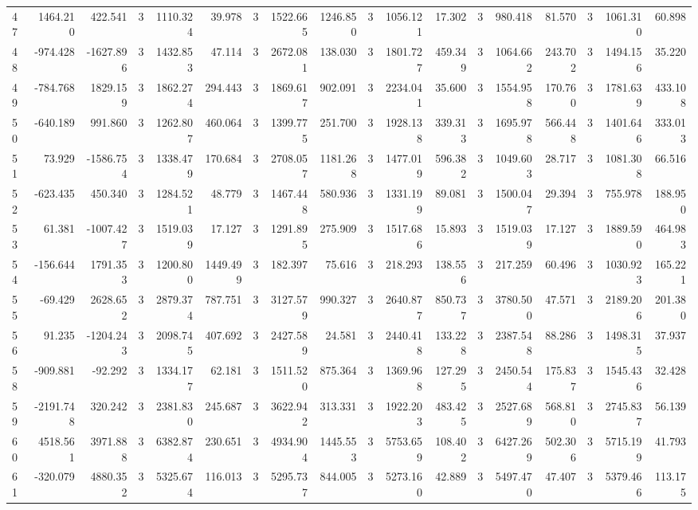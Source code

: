 \begin{table}[ht]
\begin{tabular}{lrrrrrrrrrrrrrrrrr}
47 & 1464.210 & 422.541 & 3 & 1110.324 & 39.978 & 3 & 1522.665 & 1246.850 & 3 & 1056.121 & 17.302 & 3 & 980.418 & 81.570 & 3 & 1061.310 & 60.898 \\
48 & -974.428 & -1627.896 & 3 & 1432.853 & 47.114 & 3 & 2672.081 & 138.030 & 3 & 1801.727 & 459.349 & 3 & 1064.662 & 243.702 & 3 & 1494.156 & 35.220 \\
49 & -784.768 & 1829.159 & 3 & 1862.274 & 294.443 & 3 & 1869.617 & 902.091 & 3 & 2234.041 & 35.600 & 3 & 1554.958 & 170.760 & 3 & 1781.639 & 433.108 \\
50 & -640.189 & 991.860 & 3 & 1262.807 & 460.064 & 3 & 1399.775 & 251.700 & 3 & 1928.138 & 339.313 & 3 & 1695.978 & 566.448 & 3 & 1401.646 & 333.013 \\
51 & 73.929 & -1586.754 & 3 & 1338.479 & 170.684 & 3 & 2708.057 & 1181.268 & 3 & 1477.019 & 596.382 & 3 & 1049.603 & 28.717 & 3 & 1081.308 & 66.516 \\
52 & -623.435 & 450.340 & 3 & 1284.521 & 48.779 & 3 & 1467.448 & 580.936 & 3 & 1331.199 & 89.081 & 3 & 1500.047 & 29.394 & 3 & 755.978 & 188.950 \\
53 & 61.381 & -1007.427 & 3 & 1519.039 & 17.127 & 3 & 1291.895 & 275.909 & 3 & 1517.686 & 15.893 & 3 & 1519.039 & 17.127 & 3 & 1889.590 & 464.983 \\
54 & -156.644 & 1791.353 & 3 & 1200.800 & 1449.499 & 3 & 182.397 & 75.616 & 3 & 218.293 & 138.556 & 3 & 217.259 & 60.496 & 3 & 1030.923 & 165.221 \\
55 & -69.429 & 2628.652 & 3 & 2879.374 & 787.751 & 3 & 3127.579 & 990.327 & 3 & 2640.877 & 850.737 & 3 & 3780.500 & 47.571 & 3 & 2189.206 & 201.380 \\
56 & 91.235 & -1204.243 & 3 & 2098.745 & 407.692 & 3 & 2427.589 & 24.581 & 3 & 2440.418 & 133.228 & 3 & 2387.548 & 88.286 & 3 & 1498.315 & 37.937 \\
58 & -909.881 & -92.292 & 3 & 1334.177 & 62.181 & 3 & 1511.520 & 875.364 & 3 & 1369.968 & 127.295 & 3 & 2450.544 & 175.837 & 3 & 1545.436 & 32.428 \\
59 & -2191.748 & 320.242 & 3 & 2381.830 & 245.687 & 3 & 3622.942 & 313.331 & 3 & 1922.203 & 483.425 & 3 & 2527.689 & 568.810 & 3 & 2745.837 & 56.139 \\
60 & 4518.561 & 3971.888 & 3 & 6382.874 & 230.651 & 3 & 4934.904 & 1445.553 & 3 & 5753.659 & 108.402 & 3 & 6427.269 & 502.306 & 3 & 5715.199 & 41.793 \\
61 & -320.079 & 4880.352 & 3 & 5325.674 & 116.013 & 3 & 5295.737 & 844.005 & 3 & 5273.160 & 42.889 & 3 & 5497.470 & 47.407 & 3 & 5379.466 & 113.175 \\

\end{tabular}
\end{table}
